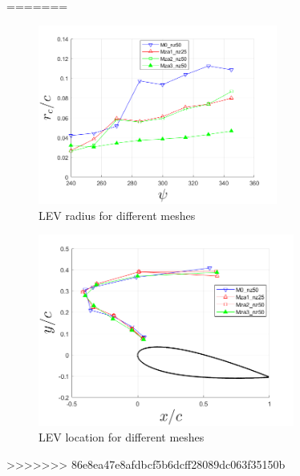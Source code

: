 =======
\begin{figure}[H]
	\centering
	\includegraphics[width=0.7\textwidth]{figures/zonal_adapt_results/LEV_Re200k/LEV_radius_vp}
	\caption{ LEV radius for different meshes}
	\label{fig:zonal_LEV_radius_Re200k}
\end{figure}


\begin{figure}[H]
	\centering
	\includegraphics[width=0.75\textwidth]{figures/zonal_adapt_results/LEV_Re200k/LEV_location_Re200k}
	\caption{ LEV location for different meshes}
	\label{fig:zonal_LEV_location_Re200k}
\end{figure}


>>>>>>> 86e8ea47e8afdbcf5b6dcff28089dc063f35150b

